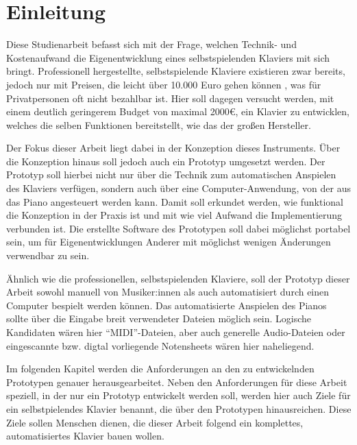 
\chapter{Einleitung} \label{einleitung}

Diese Studienarbeit befasst sich mit der Frage, welchen Technik- und Kostenaufwand die Eigenentwicklung eines selbstspielenden Klaviers mit sich bringt. %
Professionell hergestellte, selbstspielende Klaviere existieren zwar bereits,
jedoch nur mit Preisen, die leicht über 10.000 Euro gehen können \cite{YamahaU1}, was für Privatpersonen oft nicht bezahlbar ist.
Hier soll dagegen versucht werden, mit einem deutlich geringerem Budget von maximal 2000€, ein Klavier zu entwicklen, welches die selben Funktionen bereitstellt, wie das der großen Hersteller.


Der Fokus dieser Arbeit liegt dabei in der Konzeption dieses Instruments.
Über die Konzeption hinaus soll jedoch auch ein Prototyp umgesetzt werden.
Der Prototyp soll hierbei nicht nur über die Technik zum automatischen Anspielen des Klaviers verfügen, sondern auch über eine Computer-Anwendung, von der aus das Piano angesteuert werden kann.
Damit soll erkundet werden, wie funktional die Konzeption in der Praxis ist und mit wie viel Aufwand die Implementierung verbunden ist.
Die erstellte Software des Prototypen soll dabei möglichst portabel sein, um für Eigenentwicklungen Anderer mit möglichst wenigen Änderungen verwendbar zu sein.

Ähnlich wie die professionellen, selbstspielenden Klaviere, soll der Prototyp dieser Arbeit sowohl manuell von Musiker:innen als auch automatisiert durch einen Computer bespielt werden können.
Das automatisierte Anspielen des Pianos sollte über die Eingabe breit verwendeter Dateien möglich sein.
Logische Kandidaten wären hier \enquote{\ac{MIDI}}-Dateien, aber auch generelle Audio-Dateien oder eingescannte bzw. digtal vorliegende Notensheets wären hier naheliegend.

Im folgenden Kapitel werden die Anforderungen an den zu entwickelnden Prototypen genauer herausgearbeitet.
Neben den Anforderungen für diese Arbeit speziell, in der nur ein Prototyp entwickelt werden soll,
werden hier auch Ziele für ein selbstpielendes Klavier benannt, die über den Prototypen hinausreichen.
Diese Ziele sollen Menschen dienen, die dieser Arbeit folgend ein komplettes, automatisiertes Klavier bauen wollen.

